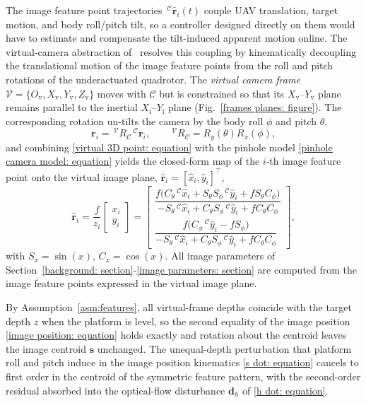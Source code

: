 \documentclass{IEEEtaes}
\theoremstyle{definition}
\theoremstyle{remark}
\begin{document}
The image feature point trajectories $\,^\mathcal{C}\hat{\boldsymbol{r}}_i(t)$ couple UAV translation, target motion, and body roll/pitch tilt, so a controller designed directly on them would have to estimate and compensate the tilt-induced apparent motion online. The virtual-camera abstraction of~\cite{fink2017,xie2016_2} resolves this coupling by kinematically decoupling the translational motion of the image feature points from the roll and pitch rotations of the underactuated quadrotor. The \emph{virtual camera frame} $\mathcal{V}=\{O_{\text{v}},X_{\text{v}},Y_{\text{v}},Z_{\text{v}}\}$ moves with $\mathcal{C}$ but is constrained so that its $X_{\text{v}}$--$Y_{\text{v}}$ plane remains parallel to the inertial $X_{\text{i}}$--$Y_{\text{i}}$ plane (Fig.~\ref{frames planes: figure}). The corresponding rotation un-tilts the camera by the body roll $\phi$ and pitch $\theta$,
\begin{equation}
\label{virtual 3D point: equation}
    \boldsymbol{r}_i = \,^\mathcal{V}R_\mathcal{C}\,^\mathcal{C}\boldsymbol{r}_i, \qquad \,^\mathcal{V}R_\mathcal{C} = R_y(\theta)R_x(\phi),
\end{equation}
and combining \eqref{virtual 3D point: equation} with the pinhole model \eqref{pinhole camera model: equation} yields the closed-form map of the $i$-th image feature point onto the virtual image plane, $\hat{\boldsymbol{r}}_i=[\hat{x}_i,\hat{y}_i]^\top$,
\begin{equation}
\label{virtual feature point: equation}
    \hat{\boldsymbol{r}}_i = \frac{f}{z_i}\begin{bmatrix} x_i \\ y_i \end{bmatrix} = \begin{bmatrix}
        \dfrac{f\big(C_\theta\,^\mathcal{C}\hat{x}_i + S_\theta S_\phi\,^\mathcal{C}\hat{y}_i + f S_\theta C_\phi\big)}{-S_\theta\,^\mathcal{C}\hat{x}_i + C_\theta S_\phi\,^\mathcal{C}\hat{y}_i + f C_\theta C_\phi} \\[4pt]
        \dfrac{f\big(C_\phi\,^\mathcal{C}\hat{y}_i - f S_\phi\big)}{-S_\theta\,^\mathcal{C}\hat{x}_i + C_\theta S_\phi\,^\mathcal{C}\hat{y}_i + f C_\theta C_\phi}
    \end{bmatrix},
\end{equation}
with $S_x=\sin(x)$, $C_x=\cos(x)$. All image parameters of Section~\ref{background: section}-\ref{image parameters: section} are computed from the image feature points expressed in the virtual image plane.

By Assumption~\ref{asm:features}, all virtual-frame depths coincide with the target depth $z$ when the platform is level, so the second equality of the image position \eqref{image position: equation} holds exactly and rotation about the centroid leaves the image centroid $\boldsymbol{s}$ unchanged. The unequal-depth perturbation that platform roll and pitch induce in the image position kinematics \eqref{s dot: equation} cancels to first order in the centroid of the symmetric feature pattern, with the second-order residual absorbed into the optical-flow disturbance $\boldsymbol{d}_h$ of \eqref{h dot: equation}.
\end{document}
